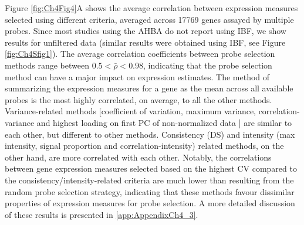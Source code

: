 Figure \ref{fig:Ch4Fig4}A shows the average correlation between expression measures selected using different criteria, averaged across \num{17769} genes assayed by multiple probes. Since most studies using the AHBA do not report using IBF, we show results for unfiltered data (similar results were obtained using IBF, see Figure \ref{fig:Ch4Sfig1}). The average correlation coefficients between probe selection methods range between $0.5 < \bar{\rho} < 0.98$, indicating that the probe selection method can have a major impact on expression estimates. The method of summarizing the expression measures for a gene as the mean across all available probes is the most highly correlated, on average, to all the other methods. Variance-related methods [coefficient of variation, maximum variance, correlation-variance and highest loading on first PC of non-normalized data \citep{Parkes2017}] are similar to each other, but different to other methods. Consistency (DS) and intensity (max intensity, signal proportion and correlation-intensity) related methods, on the other hand, are more correlated with each other. Notably, the correlations between gene expression measures selected based on the highest CV compared to the consistency/intensity-related criteria are much lower than resulting from the random probe selection strategy, indicating that these methods favour dissimilar properties of expression measures for probe selection. A more detailed discussion of these results is presented in \ref{app:AppendixCh4_3}.

